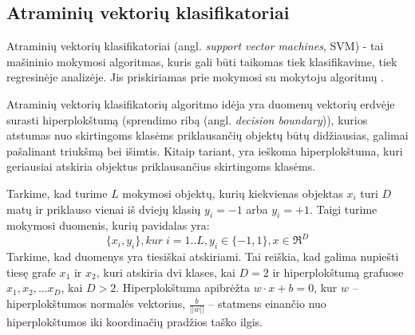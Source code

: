 \subsection{Atraminių vektorių klasifikatoriai}

Atraminių vektorių klasifikatoriai (angl. \textit{support vector machines}, SVM) - tai mašininio mokymosi  algoritmas, kuris gali būti taikomas tiek klasifikavime, tiek regresinėje analizėje. Jis priskiriamas prie mokymosi su mokytoju algoritmų \cite{vapnik2000nature}.

Atraminių vektorių klasifikatorių algoritmo idėja yra duomenų vektorių erdvėje surasti hiperplokštumą (sprendimo ribą (angl. \textit{decision boundary})), kurios atstumas nuo skirtingoms klasėms priklausančių objektų būtų didžiausias, galimai pašalinant triukšmą bei išimtis. Kitaip tariant, yra ieškoma hiperplokštuma, kuri geriausiai atskiria objektus priklausančius skirtingoms klasėms. 

Tarkime, kad turime $L$ mokymosi objektų, kurių kiekvienas objektas $x_i$ turi $D$ matų ir priklauso vienai iš dviejų klasių $y_i=-1$ arba $y_i=+1$. Taigi turime mokymosi duomenis, kurių pavidalas yra:
\begin{equation}
 \{x_i, y_i\}, kur\; i=1..L, y_i \in \{-1,1\}, x \in \Re^D
\end{equation}
Tarkime, kad duomenys yra tiesiškai atskiriami. Tai reiškia, kad galima nupiešti tiesę grafe $x_1$ ir $x_2$, kuri atskiria dvi klases, kai $D=2$ ir hiperplokštumą grafuose $x_1, x_2,...x_D$, kai $D > 2$. Hiperplokštuma apibrėžta $w\cdot x + b = 0$, kur $w$ -- hiperplokštumos normalės vektorius, $\frac{b}{||w||}$ -- statmens einančio nuo hiperplokštumos iki koordinačių pradžios taško ilgis.


